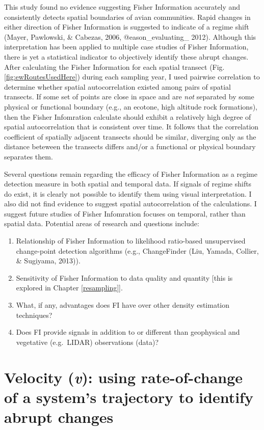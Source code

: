 \documentclass[12pt,twoside,openany]{reedthesis}
\providecommand{\tightlist}{%
  \setlength{\itemsep}{0pt}\setlength{\parskip}{0pt}}
\begin{document}
This study found no evidence suggesting Fisher Information accurately and consistently detects spatial boundaries of avian communities. Rapid changes in either direction of Fisher Information is suggested to indicate of a regime shift (Mayer, Pawlowski, \& Cabezas, 2006, @eason\_evaluating\_ 2012). Although this interpretation has been applied to multiple case studies of Fisher Information, there is yet a statistical indicator to objectively identify these abrupt changes. After calculating the Fisher Information for each spatial transect (Fig. \ref{fig:ewRoutesUsedHere}) during each sampling year, I used pairwise correlation to determine whether spatial autocorrelation existed among pairs of spatial transects. If some set of points are close in space and are \emph{not} separated by some physical or functional boundary (e.g., an ecotone, high altitude rock formations), then the Fisher Infomration calculate should exhibit a relatively high degree of spatial autocorrelation that is consistent over time. It follows that the correlation coefficient of spatially adjacent transects should be similar, diverging only as the distance beteween the transects differs and/or a functional or physical boundary separates them.

Several questions remain regarding the efficacy of Fisher Information as a regime detection measure in both spatial and temporal data. If signals of regime shifts do exist, it is clearly not possible to identify them using visual interpretation. I also did not find evidence to suggest spatial autocorrelation of the calculations. I suggest future studies of Fisher Infomration focuses on temporal, rather than spatial data. Potential areas of research and questions include:
\begin{enumerate}
\def\labelenumi{\arabic{enumi}.}
\tightlist
\item
  Relationship of Fisher Information to likelihood ratio-based unsupervised change-point detection algorithms (e.g., ChangeFinder (Liu, Yamada, Collier, \& Sugiyama, 2013)).\\
\item
  Sensitivity of Fisher Information to data quality and quantity {[}this is explored in Chapter \ref{resampling}{]}.\\
\item
  What, if any, advantages does FI have over other density estimation techniques?\\
\item
  Does FI provide signals in addition to or different than geophysical and vegetative (e.g.~LIDAR) observations (data)?
\end{enumerate}
\hypertarget{velocity}{%
\chapter{\texorpdfstring{Velocity (\emph{v}): using rate-of-change of a system's trajectory to identify abrupt changes}{Velocity (v): using rate-of-change of a system's trajectory to identify abrupt changes}}\label{velocity}}
\end{document}
